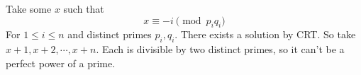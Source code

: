 Take some $x$ such that
$$x\equiv -i\pmod{p_iq_i}$$
For $1\le i\le n$ and distinct primes $p_i, q_i$. There exists a solution by CRT. So take $x+1, x+2, \cdots, x+n$.
Each is divisible by two distinct primes, so it can't be a perfect power of a prime.
